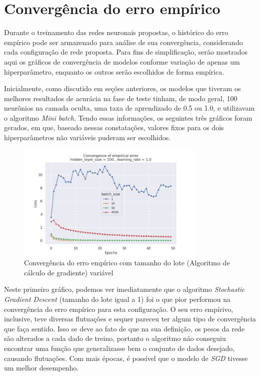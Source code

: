 \documentclass{article}
\begin{document}
\section{Convergência do erro empírico}

Durante o treinamento das redes neuronais propostas, o histórico do erro empírico pode ser armazenado para análise de sua convergência, considerando cada configuração de rede proposta. Para fins de simplificação, serão mostrados
aqui os gráficos de convergência de modelos conforme variação de apenas um hiperparâmetro, enquanto os outros serão escolhidos de forma empírica.

Inicialmente, como discutido em seções anteriores, os modelos que tiveram os melhores resultados de acurácia na fase de teste tinham, de modo geral, 100 neurônios na camada oculta, uma taxa de aprendizado de 0.5 ou 1.0, e utilizavam o algoritmo \textit{Mini batch}.
Tendo essas informações, os seguintes três gráficos foram gerados, em que, baseado nessas constatações, valores fixos para os dois hiperparâmetros não variáveis puderam ser escolhidos.

\begin{figure}[H]
{\centering
\includegraphics[width=0.8\textwidth]{images/empirical_error/batch_size_not_fixed.jpg}
\caption{Convergência do erro empírico com tamanho do lote (Algoritmo de cálculo de gradiente) variável}}
\end{figure}

Neste primeiro gráfico, podemos ver imediatamente que o algoritmo \textit{Stochastic Gradient Descent} (tamanho do lote igual a 1) foi o que pior performou na convergência do erro empírico
para esta configuração. O seu erro empírivo, inclusive, teve diversas flutuações e sequer pareceu ter algum tipo de convergência que faça sentido. Isso se deve ao fato de que na sua definição, os pesos
da rede são alterados a cada dado de treino, portanto o algoritmo não conseguiu encontrar uma função que generalizasse bem o conjunto de dados
desejado, causando flutuações. Com mais épocas, é possível que o modelo de \textit{SGD} tivesse um melhor desempenho. 
\end{document}
